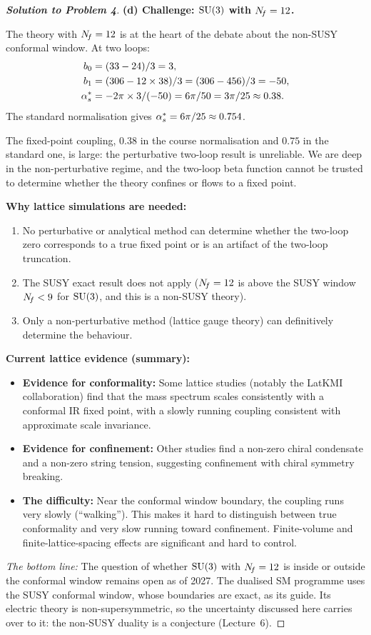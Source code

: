 \documentclass[11pt,a4paper]{article}
\begin{document}
\begin{proof}[\textbf{Solution to Problem 4}]
\textbf{(d) Challenge: $\mathrm{SU}(3)$ with $N_{\!f} = 12$.}

The theory with $N_{\!f} = 12$ is at the heart of the debate about the non-SUSY
conformal window.  At two loops:
\begin{align}
  b_0 &= (33 - 24)/3 = 3, \\
  b_1 &= (306 - 12 \times 38)/3 = (306 - 456)/3 = -50, \\
  \alpha_s^* &= -2\pi \times 3/(-50)
  = 6\pi/50 = 3\pi/25 \approx 0.38.
\end{align}
The standard normalisation gives $\alpha_s^* = 6\pi/25 \approx 0.754$.

The fixed-point coupling, $0.38$ in the course normalisation and $0.75$ in
the standard one, is large: the perturbative two-loop result is
unreliable.  We are deep in the non-perturbative regime,
and the two-loop beta function cannot be trusted to determine whether the
theory confines or flows to a fixed point.

\textbf{Why lattice simulations are needed:}
\begin{enumerate}[label=\arabic*.]
  \item No perturbative or analytical method can determine whether
    the two-loop zero corresponds to a true fixed point or is an
    artifact of the two-loop truncation.
  \item The SUSY exact result does not apply ($N_{\!f} = 12$ is above the
    SUSY window $N_{\!f} < 9$ for $\mathrm{SU}(3)$, and this is a non-SUSY theory).
  \item Only a non-perturbative method (lattice gauge theory) can
    definitively determine the \IR{} behaviour.
\end{enumerate}

\textbf{Current lattice evidence (summary):}
\begin{itemize}
  \item \textbf{Evidence for conformality:} Some lattice studies
    (notably the LatKMI collaboration) find that the mass spectrum
    scales consistently with a conformal IR fixed point, with a slowly
    running coupling consistent with approximate scale invariance.
  \item \textbf{Evidence for confinement:} Other studies find a
    non-zero chiral condensate and a non-zero string tension, suggesting
    confinement with chiral symmetry breaking.
  \item \textbf{The difficulty:} Near the conformal window boundary,
    the coupling runs very slowly (``walking'').  This makes it hard to
    distinguish between true conformality and very slow running toward
    confinement.  Finite-volume and finite-lattice-spacing effects are
    significant and hard to control.
\end{itemize}

\textit{The bottom line:} The question of whether $\mathrm{SU}(3)$ with $N_{\!f} = 12$
is inside or outside the conformal window remains open as of 2027.  The
dualised SM programme uses the SUSY conformal window, whose boundaries are
exact, as its guide.  Its electric theory is non-supersymmetric, so the
uncertainty discussed here carries over to it: the non-SUSY duality is a
conjecture (Lecture~6).
\end{proof}
\end{document}
